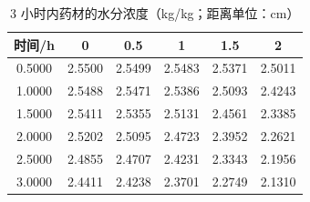 \begin{table}[htbp]
  \centering
  \caption{3 小时内药材的水分浓度（kg/kg；距离单位：cm）}
  \label{tab:q2-moisture}
  \begin{tabular}{cccccc}
    \toprule
    时间/h & 0 & 0.5 & 1 & 1.5 & 2 \\
    \midrule
    0.5000 & 2.5500 & 2.5499 & 2.5483 & 2.5371 & 2.5011 \\
    1.0000 & 2.5488 & 2.5471 & 2.5386 & 2.5093 & 2.4243 \\
    1.5000 & 2.5411 & 2.5355 & 2.5131 & 2.4561 & 2.3385 \\
    2.0000 & 2.5202 & 2.5095 & 2.4723 & 2.3952 & 2.2621 \\
    2.5000 & 2.4855 & 2.4707 & 2.4231 & 2.3343 & 2.1956 \\
    3.0000 & 2.4411 & 2.4238 & 2.3701 & 2.2749 & 2.1310 \\
    \bottomrule
  \end{tabular}
\end{table}
